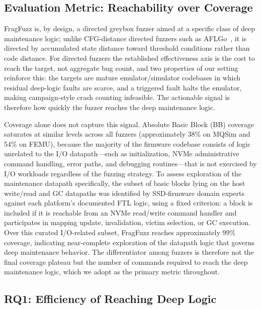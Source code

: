 \documentclass[conference]{IEEEtran}
\begin{document}
\subsection{Evaluation Metric: Reachability over Coverage}
FragFuzz is, by design, a directed greybox fuzzer aimed at a specific class of deep maintenance logic; unlike CFG-distance directed fuzzers such as AFLGo~\cite{aflgo}, it is directed by accumulated state distance toward threshold conditions rather than code distance.
For directed fuzzers the established effectiveness axis is the cost to reach the target, not aggregate bug count, and two properties of our setting reinforce this: the targets are mature emulator/simulator codebases in which residual deep-logic faults are scarce, and a triggered fault halts the emulator, making campaign-style crash counting infeasible.
The actionable signal is therefore how quickly the fuzzer reaches the deep maintenance logic.

Coverage alone does not capture this signal.
Absolute Basic Block (BB) coverage saturates at similar levels across all fuzzers (approximately 38\% on MQSim and 54\% on FEMU), because the majority of the firmware codebase consists of logic unrelated to the I/O datapath---such as initialization, NVMe administrative command handling, error paths, and debugging routines---that is not exercised by I/O workloads regardless of the fuzzing strategy.
To assess exploration of the maintenance datapath specifically, the subset of basic blocks lying on the host write/read and GC datapaths was identified by SSD-firmware domain experts against each platform's documented FTL logic, using a fixed criterion: a block is included if it is reachable from an NVMe read/write command handler and participates in mapping update, invalidation, victim selection, or GC execution.
Over this curated I/O-related subset, FragFuzz reaches approximately 99\% coverage, indicating near-complete exploration of the datapath logic that governs deep maintenance behavior.
The differentiator among fuzzers is therefore not the final coverage plateau but the number of commands required to reach the deep maintenance logic, which we adopt as the primary metric throughout.

\subsection{RQ1: Efficiency of Reaching Deep Logic}
\end{document}
